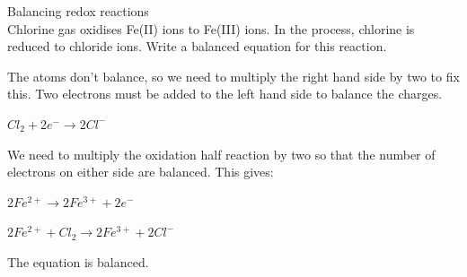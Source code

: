 \begin{wex}{Balancing redox reactions\\}{Chlorine gas oxidises Fe(II) ions to Fe(III) ions. In the process, chlorine is reduced to chloride ions. Write a balanced equation for this reaction.\\}
{The atoms don't balance, so we need to multiply the right hand side by two to fix this. Two electrons must be added to the left hand side to balance the charges.

\begin{center}
\rm${Cl_{2} + 2e^{-} \rightarrow 2Cl^{-}}$
\end{center}

We need to multiply the oxidation half reaction by two so that the number of electrons on either side are balanced. This gives:

\begin{center}
\rm${2Fe^{2+} \rightarrow 2Fe^{3+} + 2e^{-}}$\\
\end{center}

\begin{center}
\rm${2Fe^{2+} + Cl_{2} \rightarrow 2Fe^{3+} + 2Cl^{-}}$\\
\end{center}
The equation is balanced.
}
\end{wex}

